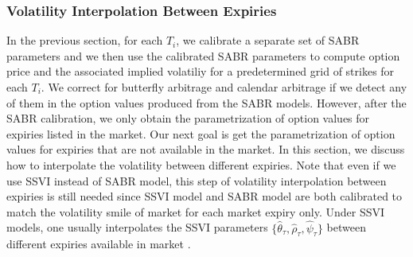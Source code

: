 \documentclass[letterpaper,12pt,titlepage,oneside,final]{book}
\numberwithin{equation}{section}
\theoremstyle{definition}
\begin{document}
 
 
 
 




 





\subsubsection{Volatility Interpolation Between Expiries}
In the previous section, for each $T_i$, we calibrate a separate set of SABR parameters and we then use the calibrated SABR parameters to compute option price and the associated implied volatiliy for a predetermined grid of strikes for each $T_i$. We correct for butterfly arbitrage and calendar arbitrage if we detect any of them in the option values produced from the SABR models. However, after the SABR calibration, we only obtain the parametrization of  option values for expiries listed in the market. Our next goal is get  the parametrization of option values for expiries that are not available in the market. In this section, we discuss how to interpolate the volatility between different expiries. Note that even if we use SSVI instead of SABR model, this step of volatility interpolation between expiries is still needed since SSVI model and SABR model are both calibrated to match the volatility smile of market for each market expiry only. Under SSVI models, one usually interpolates   the SSVI parameters $\{\hat{\theta}_{\tau},\hat{\rho}_{\tau},\hat{\psi}_{\tau}\}$ between different expiries available in market \cite{corbetta2019robust}.
\end{document}
